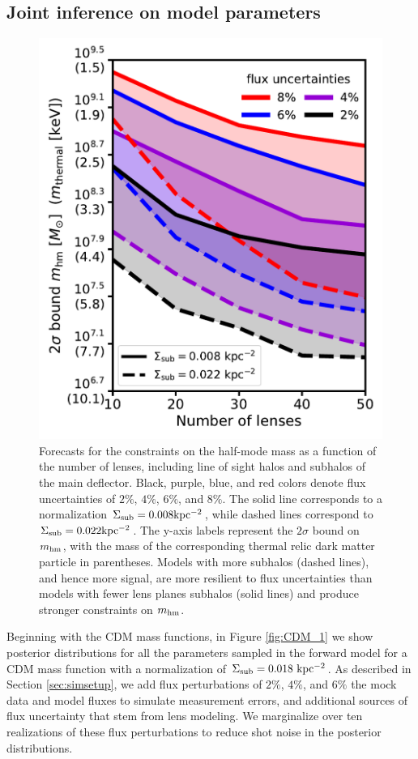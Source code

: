 \subsection{Joint inference on model parameters}
\label{ssec:inference}
\begin{figure}
	\centering
	\includegraphics[clip,trim=0cm 0cm 0cm
	0cm,width=.75\textwidth,keepaspectratio]{./figures_LOSforward/2sigma_mhm.pdf}
	\caption[Projections on the constraints on the half-mode mass as a function of the number of lenses and measurement uncertainties, accounting for line-of-sight halos]{\label{fig:2sigmamhm} Forecasts for the constraints on the half-mode mass as a function of the number of lenses, including line of sight halos and subhalos of the main deflector. Black, purple, blue, and red colors denote flux uncertainties of $2\%$, $4\%$, $6\%$, and $8\%$. The solid line corresponds to a normalization $\Sigma_{\rm{sub}} = 0.008 \rm{kpc^{-2}}$, while dashed lines correspond to $\Sigma_{\rm{sub}} = 0.022 \rm{kpc^{-2}}$. The y-axis labels represent the $2 \sigma$ bound on ${m_{\rm{hm}}}$, with the mass of the corresponding thermal relic dark matter particle in parentheses. Models with more subhalos (dashed lines), and hence more signal, are more resilient to flux uncertainties than models with fewer lens planes subhalos (solid lines) and produce stronger constraints on ${m_{\rm{hm}}}$. }
\end{figure}	
Beginning with the CDM mass functions, in Figure \ref{fig:CDM_1} we show posterior distributions for all the parameters sampled in the forward model for a CDM mass function with a normalization of $\Sigma_{\rm{sub}} = 0.018 \ \rm{kpc^{-2}}$. As described in Section \ref{sec:simsetup}, we add flux perturbations of $2 \%$, $4 \%$, and $6 \%$ the mock data and model fluxes to simulate measurement errors, and additional sources of flux uncertainty that stem from lens modeling. We marginalize over ten realizations of these flux perturbations to reduce shot noise in the posterior distributions. 

